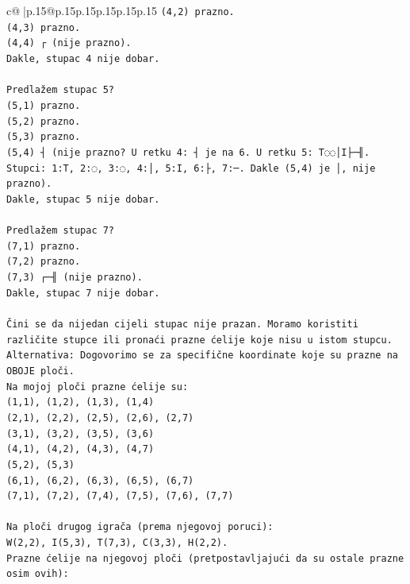 \documentclass{article}
\begin{document}
{\begin{supertabular}{c@{$\;$}|p{.15\linewidth}@{}p{.15\linewidth}p{.15\linewidth}p{.15\linewidth}p{.15\linewidth}p{.15\linewidth}}
{{{\texttt{(4,2) prazno.} \\
\texttt{(4,3) prazno.} \\
\texttt{(4,4) ┌ (nije prazno).} \\
\texttt{Dakle, stupac 4 nije dobar.} \\
\\ 
\texttt{Predlažem stupac 5?} \\
\texttt{(5,1) prazno.} \\
\texttt{(5,2) prazno.} \\
\texttt{(5,3) prazno.} \\
\texttt{(5,4) ┤ (nije prazno? U retku 4: ┤ je na 6. U retku 5: T◌◌│I├─╢. Stupci: 1:T, 2:◌, 3:◌, 4:│, 5:I, 6:├, 7:─. Dakle (5,4) je │, nije prazno).} \\
\texttt{Dakle, stupac 5 nije dobar.} \\
\\ 
\texttt{Predlažem stupac 7?} \\
\texttt{(7,1) prazno.} \\
\texttt{(7,2) prazno.} \\
\texttt{(7,3) ┌─╢ (nije prazno).} \\
\texttt{Dakle, stupac 7 nije dobar.} \\
\\ 
\texttt{Čini se da nijedan cijeli stupac nije prazan. Moramo koristiti različite stupce ili pronaći prazne ćelije koje nisu u istom stupcu.} \\
\texttt{Alternativa: Dogovorimo se za specifične koordinate koje su prazne na OBOJE ploči.} \\
\texttt{Na mojoj ploči prazne ćelije su:} \\
\texttt{(1,1), (1,2), (1,3), (1,4)} \\
\texttt{(2,1), (2,2), (2,5), (2,6), (2,7)} \\
\texttt{(3,1), (3,2), (3,5), (3,6)} \\
\texttt{(4,1), (4,2), (4,3), (4,7)} \\
\texttt{(5,2), (5,3)} \\
\texttt{(6,1), (6,2), (6,3), (6,5), (6,7)} \\
\texttt{(7,1), (7,2), (7,4), (7,5), (7,6), (7,7)} \\
\\ 
\texttt{Na ploči drugog igrača (prema njegovoj poruci):} \\
\texttt{W(2,2), I(5,3), T(7,3), C(3,3), H(2,2).} \\
\texttt{Prazne ćelije na njegovoj ploči (pretpostavljajući da su ostale prazne osim ovih):} \\
}}}
\end{supertabular}}
\end{document}
